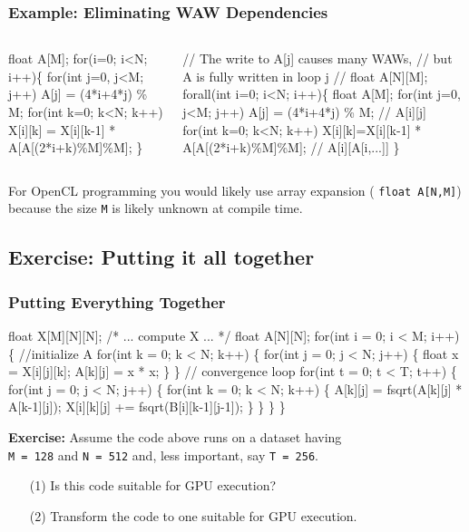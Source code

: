 \documentclass{beamer}
\renewcommand{\emph}[1]{\textcolor{CosGreen}{ #1}}
\newcommand{\emp}[1]{\textcolor{DikuRed}{ #1}}
\begin{document}
\begin{frame}[fragile,t]
  \frametitle{Example: Eliminating WAW Dependencies} 

\begin{columns}
\begin{colorcode}[fontsize=\scriptsize]
  \emp{float A[M];}
  \emp{for}(i=0; i<N; i++)\{
    for(int j=0, j<M; j++)
        \emp{A[j]} = (4*i+4*j) \% M;
    for(int k=0; k<N; k++)
        X[i][k] = X[i][k-1] * 
           \emp{A[A[(2*i+k)\%M]\%M]};
  \}\pause
\end{colorcode}

\begin{colorcode}[fontsize=\scriptsize]
  // \emp{The write to A[j] causes many WAWs},\pause
  // \emph{but A is fully written in loop j}
  // \emph{float A[N][M];}
  \emph{forall}(int i=0; i<N; i++)\{
    \emph{float A[M];}
    for(int j=0, j<M; j++)
        \emph{A[j]} = (4*i+4*j) \% M; // \emph{A[i][j]}
    for(int k=0; k<N; k++)
        X[i][k]=X[i][k-1] * 
           \emph{A[A[(2*i+k)\%M]\%M]};
           //\emph{A[i][A[i,...]]}
  \}
\end{colorcode}
\end{columns}

For OpenCL programming you would likely use array expansion (\emph{\tt float A[N,M]})
because the size {\tt M} is likely unknown at compile time.\smallskip

\end{frame}

\subsection{Exercise: Putting it all together}

\begin{frame}[fragile,t]
  \frametitle{Putting Everything Together} 

\begin{colorcode}[fontsize=\scriptsize]
float X[M][N][N]; /* ... compute X ... */
float A[N][N];
for(int i = 0; i < M; i++) \{
  \emp{//initialize A}
  for(int k = 0; k < N; k++) \{
    for(int j = 0; j < N; j++) \{
        float x = X[i][j][k];
        A[k][j] = x * x;
  \} \}
  \emp{// convergence loop}
  for(int t = 0; t < T; t++) \{
    for(int j = 0; j < N; j++) \{
      for(int k = 0; k < N; k++) \{
        A[k][j] = fsqrt(A[k][j] * A[k-1][j]);
        X[i][k][j] += fsqrt(B[i][k-1][j-1]);
      \}
    \}
\} \}
\end{colorcode}

{\bf Exercise:} 
Assume the code above runs on a dataset having\\
{\tt M = 128} and {\tt N = 512} and, less important, say {\tt T = 256}.\\\smallskip
\begin{itemize}
    \item[(1)] Is this code suitable for GPU execution?\\\smallskip
    \item[(2)] Transform the code to one suitable for GPU execution.
\end{itemize}
\end{frame}
\end{document}
